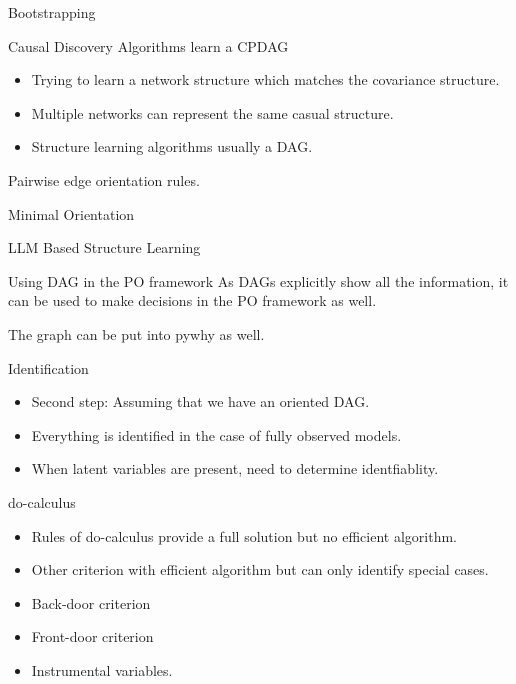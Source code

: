 \documentclass{beamer}
\begin{document}
\begin{frame}{Bootstrapping}
\end{frame}

\begin{frame}{Causal Discovery Algorithms learn a CPDAG}
	\begin{itemize}
		\item Trying to learn a network structure which matches the covariance
			structure.
		\item Multiple networks can represent the same casual structure.
		\item Structure learning algorithms usually a DAG.
	\end{itemize}

	Pairwise edge orientation rules.
\end{frame}

\begin{frame}{Minimal Orientation}
\end{frame}

\begin{frame}{LLM Based Structure Learning}
\end{frame}

\begin{frame}{Using DAG in the PO framework}
	As DAGs explicitly show all the information, it can be used to make
	decisions in the PO framework as well.

	The graph can be put into pywhy as well.
\end{frame}

\begin{frame}{Identification}
	\begin{itemize}
		\item Second step: Assuming that we have an oriented DAG.
		\item Everything is identified in the case of fully observed models.
		\item When latent variables are present, need to determine identfiablity.
	\end{itemize}
\end{frame}

\begin{frame}{do-calculus}
	\begin{itemize}
		\item Rules of do-calculus provide a full solution but no
			efficient algorithm.
		\item Other criterion with efficient algorithm but can only
			identify special cases.
		\item Back-door criterion
		\item Front-door criterion
		\item Instrumental variables.
	\end{itemize}
\end{frame}
\end{document}
